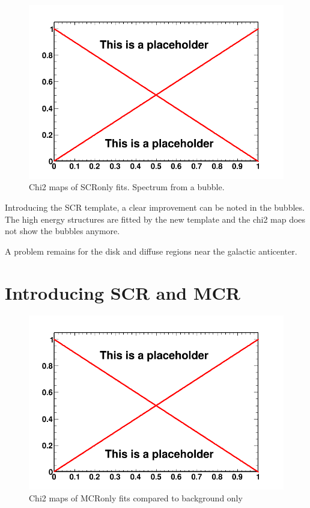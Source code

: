 \begin{figure}
  \centering
  \includegraphics[width=.9\linewidth]{pic/dummy.png}
  \caption{Chi2 maps of SCRonly fits. Spectrum from a bubble.}
  \label{fig:SCRonly_fit}
\end{figure}

Introducing the SCR template, a clear improvement can be noted in the bubbles. The high energy structures are fitted by the new template and the chi2 map does not show the bubbles anymore.

A problem remains for the disk and diffuse regions near the galactic anticenter.



\section{Introducing SCR and MCR}

\begin{figure}
  \centering
  \includegraphics[width=.9\linewidth]{pic/dummy.png}
  \caption{Chi2 maps of MCRonly fits compared to background only}
  \label{fig:MCRonly_fit}
\end{figure}

